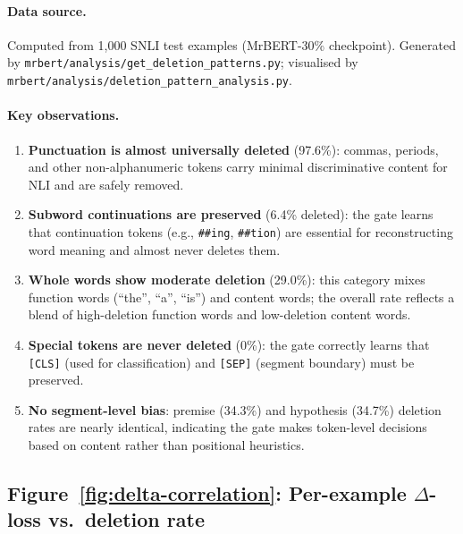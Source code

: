 \documentclass{article} %
\begin{document}
\paragraph{Data source.}
Computed from 1,000 SNLI test examples (MrBERT-30\% checkpoint). Generated by \texttt{mrbert/analysis/get\_deletion\_patterns.py}; visualised by \texttt{mrbert/analysis/deletion\_pattern\_analysis.py}.

\paragraph{Key observations.}
\begin{enumerate}[nosep]
    \item \textbf{Punctuation is almost universally deleted} (97.6\%): commas, periods, and other non-alphanumeric tokens carry minimal discriminative content for NLI and are safely removed.
    \item \textbf{Subword continuations are preserved} (6.4\% deleted): the gate learns that continuation tokens (e.g., \texttt{\#\#ing}, \texttt{\#\#tion}) are essential for reconstructing word meaning and almost never deletes them.
    \item \textbf{Whole words show moderate deletion} (29.0\%): this category mixes function words (``the'', ``a'', ``is'') and content words; the overall rate reflects a blend of high-deletion function words and low-deletion content words.
    \item \textbf{Special tokens are never deleted} (0\%): the gate correctly learns that \texttt{[CLS]} (used for classification) and \texttt{[SEP]} (segment boundary) must be preserved.
    \item \textbf{No segment-level bias}: premise (34.3\%) and hypothesis (34.7\%) deletion rates are nearly identical, indicating the gate makes token-level decisions based on content rather than positional heuristics.
\end{enumerate}


\subsection{Figure~\ref{fig:delta-correlation}: Per-example \texorpdfstring{$\Delta$}{Delta}-loss vs.\ deletion rate}
\end{document}
